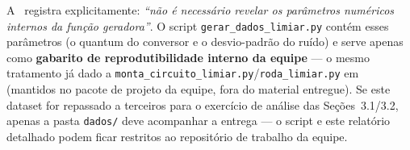 \begin{caixa}[title={Nota de sigilo sobre \texttt{gerar\_dados\_limiar.py}}]
A~\cite{orientacao2026} registra explicitamente: \emph{``não é necessário revelar os parâmetros
numéricos internos da função geradora''}. O script \texttt{gerar\_dados\_limiar.py} contém esses
parâmetros (o quantum do conversor e o desvio-padrão do ruído) e serve apenas como
\textbf{gabarito de reprodutibilidade interno da equipe} --- o mesmo tratamento já dado a
\texttt{monta\_circuito\_limiar.py}/\texttt{roda\_limiar.py} em~\cite{limiarv1} (mantidos no
pacote de projeto da equipe, fora do material entregue). Se este dataset for repassado a
terceiros para o exercício de análise das Seções~3.1/3.2, apenas a pasta \texttt{dados/} deve
acompanhar a entrega --- o script e este relatório detalhado podem ficar restritos ao
repositório de trabalho da equipe.
\end{caixa}



